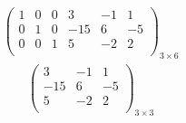 \documentclass{article}
\begin{document}
\begin{align*}
\left(
\begin{array}{ccc|ccc}
1 & 0 & 0 & 3 & -1 & 1\\
0 & 1 & 0 & -15 & 6 & -5\\
0 & 0 & 1 & 5 & -2 & 2\\
\end{array}
\right)_{3\times 6}
\end{align*}
\begin{align*}
\begin{pmatrix}
3 & -1 & 1\\
-15 & 6 & -5\\
5 & -2 & 2\\
\end{pmatrix}_{3\times 3}
\end{align*}
\\
\end{document}
